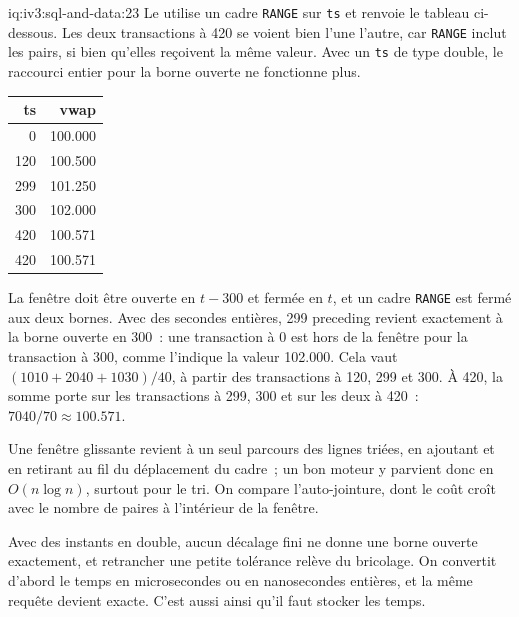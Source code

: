 \begin{solution}{iq:iv3:sql-and-data:23}
Le  utilise un cadre \texttt{RANGE} sur \texttt{ts} et renvoie le tableau ci-dessous. Les deux transactions à 420 se voient bien l'une l'autre, car \texttt{RANGE} inclut les pairs, si bien qu'elles reçoivent la même valeur. Avec un \texttt{ts} de type double, le raccourci entier pour la borne ouverte ne fonctionne plus.
\label{lst:iv3:sq:rvwap}
\begin{center}\small
\begin{tabular}{rr}
ts & vwap\\\hline
0 & 100.000\\
120 & 100.500\\
299 & 101.250\\
300 & 102.000\\
420 & 100.571\\
420 & 100.571
\end{tabular}
\end{center}
La fenêtre doit être ouverte en $t - 300$ et fermée en $t$, et un cadre \texttt{RANGE} est fermé aux deux bornes. Avec des secondes entières, 299 preceding revient exactement à la borne ouverte en 300~: une transaction à 0 est hors de la fenêtre pour la transaction à 300, comme l'indique la valeur 102.000. Cela vaut $(1010 + 2040 + 1030) / 40$, à partir des transactions à 120, 299 et 300. À 420, la somme porte sur les transactions à 299, 300 et sur les deux à 420~: $7040 / 70 \approx 100.571$.

Une fenêtre glissante revient à un seul parcours des lignes triées, en ajoutant et en retirant au fil du déplacement du cadre~; un bon moteur y parvient donc en $O(n \log n)$, surtout pour le tri. On compare l'auto-jointure, dont le coût croît avec le nombre de paires à l'intérieur de la fenêtre.

Avec des instants en double, aucun décalage fini ne donne une borne ouverte exactement, et retrancher une petite tolérance relève du bricolage. On convertit d'abord le temps en microsecondes ou en nanosecondes entières, et la même requête devient exacte. C'est aussi ainsi qu'il faut stocker les temps.

\end{solution}

